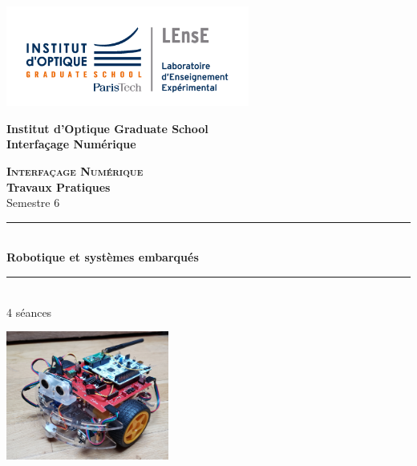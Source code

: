 \documentclass[a4paper,11pt,titlepage]{article} %
\begin{document}
\begin{titlepage}

\begin{center}
	\begin{minipage}{2.5cm}
	\begin{center}
		\includegraphics[width=8cm]{images/Logo-LEnsE.png}
	\end{center}
\end{minipage}\hfill
\begin{minipage}{10cm}
	\begin{center}
	\textbf{Institut d'Optique Graduate School }\\[0.1cm]
    \textbf{Interfaçage Numérique}


	\end{center}
\end{minipage}\hfill


\vspace{4cm}


{\huge \bfseries \textsc{Interfaçage Numérique}} \\[0.5cm]
{\large \bfseries Travaux Pratiques} \\[0.2cm]
Semestre 6

\vspace{2cm}
\rule{\linewidth}{0.3mm} \\[0.4cm]
{ \huge \bfseries\color{violet_iogs} Robotique et systèmes embarqués\\[0.4cm] }
\rule{\linewidth}{0.3mm} \\[1cm]

4 séances

\bigskip

\begin{center}
	\includegraphics[width=0.4\textwidth]{images/robot_joycar.jpg}
\end{center}

\vfill


\end{center}
\end{titlepage}
\end{document}
